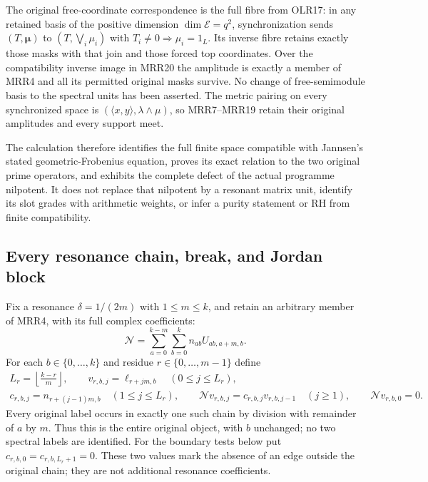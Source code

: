 The original free-coordinate correspondence is the full
fibre from OLR17: in any retained basis of the positive
dimension $\dim\mathcal E=q^2$, synchronization sends
$(T,\boldsymbol\mu)$ to $(T,\bigvee_i\mu_i)$ with
$T_i\ne0\Rightarrow\mu_i=1_L$.
Its inverse fibre retains exactly those masks with that
join and those forced top coordinates.
Over the compatibility inverse image in MRR20 the amplitude
is exactly a member of MRR4 and all its permitted original
masks survive. No change of free-semimodule basis to the
spectral units has been asserted.
The metric pairing on every synchronized space is
$(\langle x,y\rangle,\lambda\wedge\mu)$, so MRR7--MRR19
retain their original amplitudes and every support meet.

The calculation therefore identifies the full finite space
compatible with Jannsen's stated geometric-Frobenius equation,
proves its exact relation to the two original prime operators,
and exhibits the complete defect of the actual programme
nilpotent. It does not replace that nilpotent by a resonant
matrix unit, identify its slot grades with arithmetic weights,
or infer a purity statement or RH from finite compatibility.

\subsection{Every resonance chain, break, and Jordan block}

Fix a resonance $\delta=1/(2m)$ with $1\le m\le k$, and
retain an arbitrary member of MRR4, with its full complex coefficients:
\[
\mathcal N=\sum_{a=0}^{k-m}\sum_{b=0}^k n_{ab}U_{ab,a+m,b}.
\]
For each $b\in\{0,\ldots,k\}$ and residue
$r\in\{0,\ldots,m-1\}$ define
\[
\begin{gathered}
L_r=\left\lfloor\frac{k-r}{m}\right\rfloor,\qquad
v_{r,b,j}=\ell_{r+jm,b}\quad(0\le j\le L_r),\\
c_{r,b,j}=n_{r+(j-1)m,b}\quad(1\le j\le L_r),\qquad
\mathcal Nv_{r,b,j}=c_{r,b,j}v_{r,b,j-1}\quad(j\ge1),\qquad
\mathcal Nv_{r,b,0}=0.
\end{gathered}
\tag{MRR21}
\]
Every original label occurs in exactly one such chain by
division with remainder of $a$ by $m$.
Thus this is the entire original object, with $b$ unchanged;
no two spectral labels are identified.
For the boundary tests below put
$c_{r,b,0}=c_{r,b,L_r+1}=0$. These two values mark the
absence of an edge outside the original chain; they are
not additional resonance coefficients.

